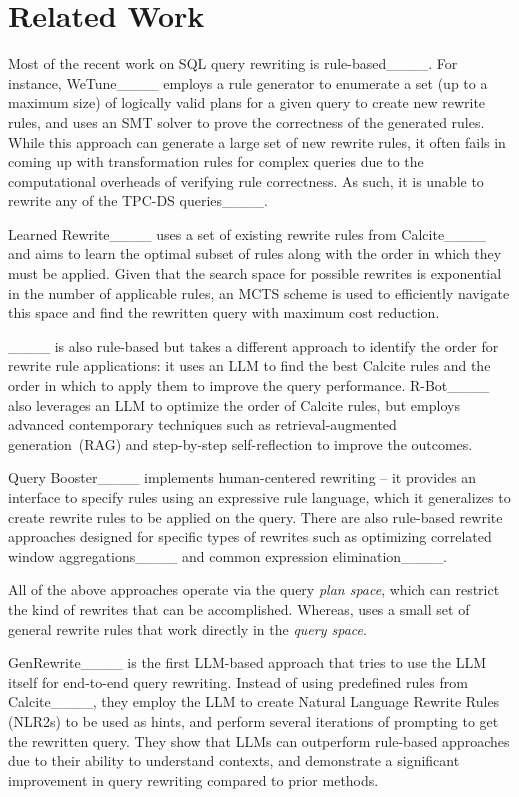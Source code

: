 \section{Related Work}
\label{sec:Related-Work}

%
Most of the recent work on SQL query rewriting is rule-based____.
%
For instance, WeTune____ employs a rule generator to enumerate a set (up to a maximum size) of logically valid plans for a given query to create new rewrite rules, and uses an SMT solver to prove the correctness of the generated rules. While this approach can generate a large set of new rewrite rules, it often fails in coming up with transformation rules for complex queries due to the computational overheads of verifying rule correctness. As such, it is unable to rewrite any of the TPC-DS queries____.

%
Learned Rewrite____ uses a set of existing rewrite rules from Calcite____ and aims to learn the optimal subset of rules along with the order in which they must be applied. Given that the search space for possible rewrites is exponential in the number of applicable rules,
an MCTS scheme is used to efficiently navigate this space and find the rewritten query with maximum cost reduction. 

%
\llmrsq____ is also rule-based but takes a different approach to identify the order for rewrite rule applications: it uses an LLM to find the best Calcite rules and the order in which to apply them to improve the query performance. R-Bot____ also leverages an LLM to optimize the order of Calcite rules, but employs advanced contemporary techniques such as retrieval-augmented generation~(RAG) and step-by-step self-reflection to improve the outcomes. 

Query Booster____ implements human-centered rewriting -- it provides an interface to specify rules using an expressive rule language, which it generalizes to create rewrite rules to be applied on the query. 
%
There are also rule-based rewrite approaches designed for specific types of rewrites such as optimizing correlated window aggregations____ and common expression elimination____. 

All of the above approaches operate via the query \emph{plan space}, which can restrict the kind of rewrites that can be accomplished. Whereas, \lithe uses a small set of general rewrite rules that work directly in the \emph{query space}.

GenRewrite____ is the first LLM-based approach that tries to use the LLM itself for end-to-end query rewriting.
Instead of using predefined rules from Calcite____, they employ the LLM to create Natural Language Rewrite Rules (NLR2s) to be used as hints, and perform several iterations of prompting to get the rewritten query. 
They show that LLMs can outperform rule-based approaches due to their ability to understand contexts, and demonstrate a significant improvement in query rewriting compared to prior methods. 

